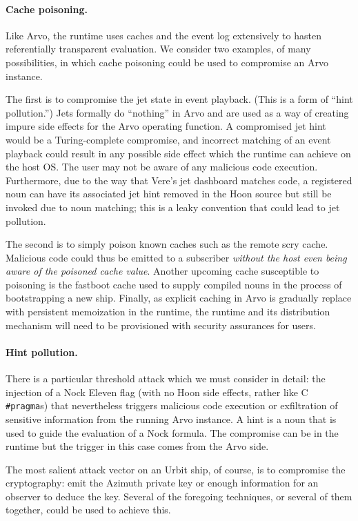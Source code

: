 \documentclass[twoside]{article}
\begin{document}
\paragraph{Cache poisoning.}  Like Arvo, the runtime uses caches and the event log extensively to hasten referentially transparent evaluation.  We consider two examples, of many possibilities, in which cache poisoning could be used to compromise an Arvo instance.

The first is to compromise the jet state in event playback.  (This is a form of ``hint pollution.'')  Jets formally do ``nothing'' in Arvo and are used as a way of creating impure side effects for the Arvo operating function.  A compromised jet hint would be a Turing-complete compromise, and incorrect matching of an event playback could result in any possible side effect which the runtime can achieve on the host OS.  The user may not be aware of any malicious code execution.  Furthermore, due to the way that Vere's jet dashboard matches code, a registered noun can have its associated jet hint removed in the Hoon source but still be invoked due to noun matching; this is a leaky convention that could lead to jet pollution.

The second is to simply poison known caches such as the remote scry cache.  Malicious code could thus be emitted to a subscriber \emph{without the host even being aware of the poisoned cache value}.  Another upcoming cache susceptible to poisoning is the fastboot cache used to supply compiled nouns in the process of bootstrapping a new ship.  Finally, as explicit caching in Arvo is gradually replace with persistent memoization in the runtime, the runtime and its distribution mechanism will need to be provisioned with security assurances for users.

\paragraph{Hint pollution.}  There is a particular threshold attack which we must consider in detail:  the injection of a Nock Eleven flag (with no Hoon side effects, rather like C \texttt{\#pragma}s) that nevertheless triggers malicious code execution or exfiltration of sensitive information from the running Arvo instance.  A hint is a noun that is used to guide the evaluation of a Nock formula.  The compromise can be in the runtime but the trigger in this case comes from the Arvo side.

The most salient attack vector on an Urbit ship, of course, is to compromise the cryptography:  emit the Azimuth private key or enough information for an observer to deduce the key.  Several of the foregoing techniques, or several of them together, could be used to achieve this.
\end{document}
